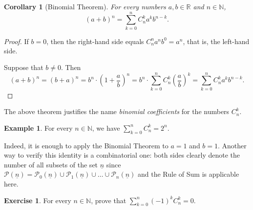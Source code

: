 \documentclass[12pt,notitlepage]{article}
\theoremstyle{plain}
\newtheorem{corr}[thm]{Corollary}
\theoremstyle{definition}
\newtheorem{exc}[thm]{Exercise}
\newtheorem{exm}[thm]{Example}
\theoremstyle{plain}
\newcommand{\N}{\mathbb{N}}
\newcommand{\R}{\mathbb{R}}
\newcommand{\mP}{\mathcal{P}}
\newcommand{\ul}[1]{\underline{#1}}
\newcommand{\1}{\mathbf{1}}
\newcommand{\0}{\mathbf{0}}
\begin{document}
\begin{corr}[Binomial Theorem]
For every numbers $a, b \in \R$ and $n \in \N$,
$$(a + b)^n = \sum_{k = 0}^n C_n^k a^k b^{n-k}.$$
\end{corr}
\begin{proof}
If $b = 0$, then the right-hand side equals $C_n^n a^n b^0 = a^n$, that is, the left-hand side.

Suppose that $b \neq 0$. Then
$$(a + b)^n = (b + a)^n = b^n \cdot \left (1 + \dfrac{a}{b} \right)^n = b^n \cdot \sum_{k = 0}^n C_n^k \left ( \dfrac{a}{b} \right)^k = \sum_{k = 0}^n C_n^k a^k b^{n-k}.$$
\end{proof}
\noindent The above theorem justifies the name \emph{binomial coefficients} for the numbers $C_n^k$.

\begin{exm}\label{L11:pow_2}
For every $n \in \N$, we have $\sum_{k = 0}^n C_n^k = 2^n$.

Indeed, it is enough to apply the Binomial Theorem to $a = 1$ and $b = 1$. Another way to verify this identity is a combinatorial one: both sides clearly denote the number of all subsets of the set $\ul{n}$ since $\mP(\ul{n}) = \mP_0(\ul{n}) \cup \mP_1(\ul{n}) \cup \ldots \cup \mP_n(\ul{n})$ and the Rule of Sum is applicable here.
\end{exm}

\begin{exc}
For every $n \in \N$, prove that $\sum_{k = 0}^n (-1)^k C_n^k = 0$.
\end{exc}
\end{document}
